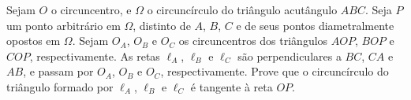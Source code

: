 Sejam $O$ o circuncentro, e $\Omega$ o circuncírculo do triângulo acutângulo $ABC$.
Seja $P$ um ponto arbitrário em $\Omega$, distinto de $A$, $B$, $C$ e de seus pontos diametralmente opostos em $\Omega$.
Sejam $O_A$, $O_B$ e $O_C$ os circuncentros dos triângulos $AOP$, $BOP$ e $COP$, respectivamente. 
As retas $\ell_A$, $\ell_B$ e $\ell_C$ são perpendiculares a $BC$, $CA$ e $AB$, e passam por $O_A$, $O_B$ e $O_C$, respectivamente.
Prove que o circuncírculo do triângulo formado por $\ell_A$, $\ell_B$ e $\ell_C$ é tangente à reta $OP$.
